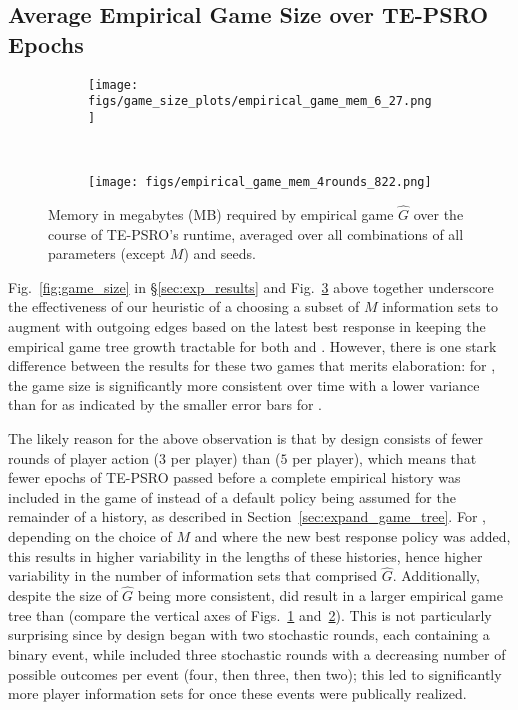 \subsection{Average Empirical Game Size over TE-PSRO Epochs}\label{app:game_size}

\begin{figure}[h]
    \centering
    \begin{subfigure}[b]{0.5\textwidth}
    \caption{\barg}
    \texttt{[image: figs/game\_size\_plots/empirical\_game\_mem\_6\_27.png]}
    \label{fig:mem_barg}
    \end{subfigure}~
    \begin{subfigure}[b]{0.5\textwidth}
    \caption{}
    \texttt{[image: figs/empirical\_game\_mem\_4rounds\_822.png]}
     \label{fig:memory_gengoof}
    \end{subfigure}
    \caption{Memory in megabytes (MB) required by empirical game $\hat{G}$ over the course of TE-PSRO's runtime, averaged over all combinations of all parameters (except $M$) and seeds.}
    \label{fig:game_size_app}
\end{figure}
Fig.~\ref{fig:game_size} in \S\ref{sec:exp_results} and 
Fig.~\ref{fig:game_size_app} above together underscore the effectiveness of our heuristic of a choosing a subset of $M$ information sets to augment with outgoing edges based on the latest best response in keeping the empirical game tree growth tractable for both \barg and . However, there is one stark difference between the results for these two games that merits elaboration: for , the game size is significantly more consistent over time with a lower variance than for \barg as indicated by the smaller error bars for . 

The likely reason for the above observation is that  by design consists of fewer rounds of player action ($3$ per player) than \barg ($5$ per player), which means that fewer epochs of TE-PSRO passed before a complete empirical history was included in the game of  instead of a default policy being assumed for the remainder of a history, as described in Section~\ref{sec:expand_game_tree}. For \barg, depending on the choice of $M$ and where the new best response policy was added, this results in higher variability in the lengths of these histories, hence higher variability in the number of information sets that comprised $\hat{G}$. Additionally, despite the size of $\hat{G}$ being more consistent,  did result in a larger empirical game tree than \barg (compare the vertical axes of Figs.~\ref{fig:mem_barg} and~\ref{fig:memory_gengoof}). This is not particularly surprising since \barg by design began with two stochastic rounds, each containing a binary event, while  included three stochastic rounds with a decreasing number of possible outcomes per event (four, then three, then two); this led to significantly more player information sets for  once these events were publically realized.


